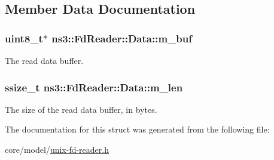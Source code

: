 \subsection{Member Data Documentation}
\subsubsection[{\texorpdfstring{m\+\_\+buf}{m_buf}}]{\setlength{\rightskip}{0pt plus 5cm}uint8\+\_\+t$\ast$ ns3\+::\+Fd\+Reader\+::\+Data\+::m\+\_\+buf}\hypertarget{structns3_1_1FdReader_1_1Data_a5cf2757af7f37ae254303f68846bcdad}{}\label{structns3_1_1FdReader_1_1Data_a5cf2757af7f37ae254303f68846bcdad}
The read data buffer. 
\subsubsection[{\texorpdfstring{m\+\_\+len}{m_len}}]{\setlength{\rightskip}{0pt plus 5cm}ssize\+\_\+t ns3\+::\+Fd\+Reader\+::\+Data\+::m\+\_\+len}\hypertarget{structns3_1_1FdReader_1_1Data_a02b2cd322fe7109e176bbff562eef94d}{}\label{structns3_1_1FdReader_1_1Data_a02b2cd322fe7109e176bbff562eef94d}
The size of the read data buffer, in bytes. 

The documentation for this struct was generated from the following file\+:\begin{DoxyCompactItemize}
\item 
core/model/\hyperlink{unix-fd-reader_8h}{unix-\/fd-\/reader.\+h}\end{DoxyCompactItemize}
